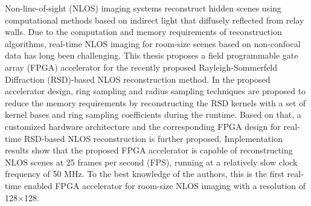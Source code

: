 \documentclass[master]{shtthesis}             %
\begin{document}
\maketitle

\frontmatter
\begin{abstract}[flattitle]
  非视域（Non-line-of-sight，NLOS）成像系统使用基于从中继面漫射反射的间接光的计算方法重构隐藏场景。由于重构算法的计算和存储需求，基于非共焦数据的室内场景的实时NLOS成像一直是一个挑战。针对最近提出的基于瑞利-索末菲衍射（Rayleigh-Sommerfeld Diffraction，RSD）的NLOS重构方法，本文设计了一种现场可编程门阵列（field programmable gate array，FPGA）加速器。在所设计的加速器中，本文提出了环形脉冲采样和径向采样技术。通过这两项技术，加速器在运行时使用一组环形基函数和线性组合系数来重构RSD卷积核来减少存储需求。在此基础上，本文进一步提出了一种基于RSD的NLOS实时重构的定制硬件架构和相应的FPGA设计。实现结果表明，该FPGA加速器能够以每秒25帧的速度重构NLOS场景，并以相对较慢的时钟频率（50MHz）运行。据作者所知，这是第一个用于室内NLOS成像的实时FPGA加速器，分辨率为128$\times$128。
\end{abstract}

\begin{abstract*}[flattitle]
  Non-line-of-sight (NLOS) imaging systems reconstruct hidden scenes using computational methods based on indirect light that diffusely reflected from relay walls. Due to the computation and memory requirements of reconstruction algorithms, real-time NLOS imaging for room-size scenes based on non-confocal data has long been challenging. This thesis proposes a field programmable gate array (FPGA) accelerator for the recently proposed Rayleigh-Sommerfeld Diffraction (RSD)-based NLOS reconstruction method. In the proposed accelerator design, ring sampling and radius sampling techniques are proposed to reduce the memory requirements by reconstructing the RSD kernels with a set of kernel bases and ring sampling coefficients during the runtime. Based on that, a customized hardware architecture and the corresponding FPGA design for real-time RSD-based NLOS reconstruction is further proposed. Implementation results show that the proposed FPGA accelerator is capable of reconstructing NLOS scenes at 25 frames per second (FPS), running at a relatively slow clock frequency of 50 MHz. To the best knowledge of the authors, this is the first real-time enabled FPGA accelerator for room-size NLOS imaging with a resolution of 128$\times$128.
\end{abstract*}

\makeindices
\end{document}
